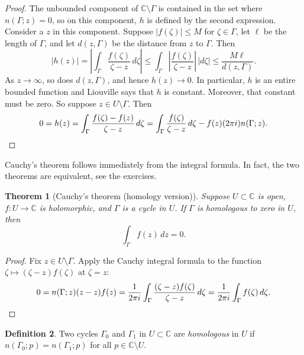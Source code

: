 \documentclass[12pt,openany]{book}
\newcommand{\sabs}[1]{\lvert {#1} \rvert}
\newcommand{\abs}[1]{\left\lvert {#1} \right\rvert}
\newcommand{\C}{{\mathbb{C}}}
\newcommand{\myindex}[1]{#1\index{#1}}
\theoremstyle{plain}
\newtheorem{thm}{Theorem}[section]
\theoremstyle{remark}
\theoremstyle{definition}
\newtheorem{defn}[thm]{Definition}
\theoremstyle{exercise}
\theoremstyle{example}
\begin{document}
\begin{proof}
The unbounded component of $\C \setminus \Gamma$ is contained in the
set where $n(\Gamma;z) = 0$, so on this component, $h$ is defined by the
second expression.  Consider a $z$ in this component.
Suppose $\sabs{f(\zeta)} \leq M$ for $\zeta \in \Gamma$, let $\ell$ be the length of
$\Gamma$, and let $d(z,\Gamma)$ be the distance from $z$ to $\Gamma$.  Then
\begin{equation*}
\sabs{h(z)}
=
\abs{
\int_\Gamma \frac{f(\zeta)}{\zeta-z} \, d\zeta
}
\leq
\int_\Gamma \abs{\frac{f(\zeta)}{\zeta-z}} \, \sabs{d\zeta}
\leq
\frac{M \ell}{d(z,\Gamma)} .
\end{equation*}
\pagebreak[3]%
As $z \to \infty$, so does $d(z,\Gamma)$, and hence $h(z) \to 0$.
In particular, $h$ is an entire bounded function and
Liouville says that $h$ is constant. Moreover, that constant must be zero.
So suppose $z \in U \setminus \Gamma$.  Then
\begin{equation*}
0 = h(z) =
\int_\Gamma \frac{f(\zeta)-f(z)}{\zeta-z} \, d\zeta
=
\int_\Gamma \frac{f(\zeta)}{\zeta-z} \, d\zeta
-
f(z) (2\pi i) n(\Gamma;z) . \qedhere
\end{equation*}
\end{proof}

Cauchy's theorem follows immediately from the integral formula.
In fact, the two theorems are equivalent, see the exercises.

\begin{thm}[Cauchy's theorem (homology version)]
%
\label{thm:CThomology}%
Suppose $U \subset \C$ is open,
$f \colon U \to \C$ is holomorphic,
and $\Gamma$ is
a cycle
in $U$.
If $\Gamma$
is homologous to zero in $U$,
then
\begin{equation*}
\int_\Gamma f(z) \, dz = 0 .
\end{equation*}
\end{thm}

\begin{proof}
Fix $z \in U \setminus \Gamma$.  Apply 
the Cauchy integral formula to the function $\zeta \mapsto
(\zeta-z)f(\zeta)$ at $\zeta=z$:
\begin{equation*}
0 = n(\Gamma;z) (z-z)f(z) =
\frac{1}{2\pi i} \int_\Gamma \frac{(\zeta-z)f(\zeta)}{\zeta-z} \, d\zeta
=
\frac{1}{2\pi i} \int_\Gamma f(\zeta) \, d\zeta . \qedhere
\end{equation*}
\end{proof}

\begin{defn}
Two cycles
$\Gamma_0$ and $\Gamma_1$ in $U
\subset \C$ are \emph{\myindex{homologous}} in $U$
if $n(\Gamma_0;p) = n(\Gamma_1;p)$ for all $p \in \C \setminus U$.
\end{defn}
\end{document}
